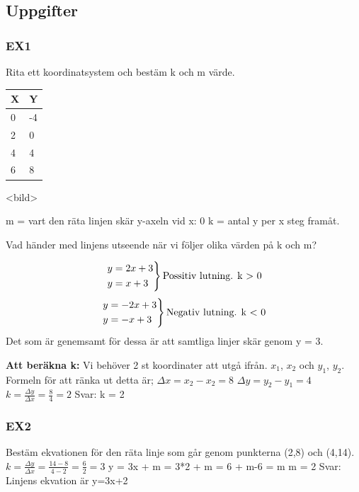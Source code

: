 \documentclass[a4paper,10pt]{article}
\begin{document}
\begin{flushleft}
\subsection{Uppgifter}
\subsubsection{EX1}
Rita ett koordinatsystem och bestäm k och m värde.\newline
\begin{tabular}{l|l}
X & Y \\ \hline
0 & -4 \\ 
2 & 0 \\ 
4 & 4 \\ 
6 & 8 \\ 
\end{tabular}
<bild>

m = vart den räta linjen skär y-axeln vid x: 0 \newline
k = antal y per x steg framåt.\newline

Vad händer med linjens utseende när vi följer olika värden på k och m?

\[
\begin{rcases*}
y = 2x + 3 \\
y = x + 3
\end{rcases*} 
\text{Possitiv lutning. k > 0}
\]
\[
\begin{rcases*}
y = -2x + 3 \\
y = -x + 3
\end{rcases*} 
\text{Negativ lutning. k < 0}
\]
Det som är genemsamt för dessa är att samtliga linjer skär genom y = 3.\newline\newline

\textbf{Att beräkna k:}\newline
Vi behöver 2 st koordinater att utgå ifrån. $x_1$, $x_2$ och $y_1$, $y_2$.\newline
Formeln för att ränka ut detta är;\newline 
$\Delta x = x_2 - x_2 = 8$ \newline
$\Delta y = y_2 - y_1 = 4$\newline
$k = \frac{\Delta y }{\Delta x } = \frac{8}{4} = 2$\newline
Svar: k = 2

\subsubsection{EX2}
Bestäm ekvationen för den räta linje som går genom punkterna (2,8) och (4,14).\newline
$k = \frac{\Delta y }{\Delta x } = \frac{14-8}{4-2} = \frac{6}{2} = 3$\newline\newline
y = 3x + m = 3*2 + m = 6 + m-6 = m\newline
m = 2\newline
Svar: Linjens ekvation är y=3x+2


\end{flushleft}
\end{document}
